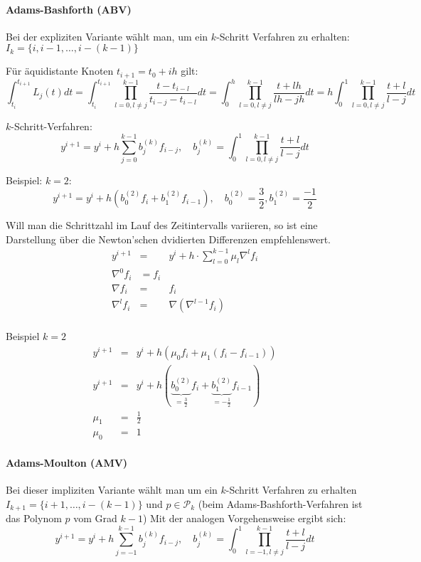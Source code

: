 \paragraph{Adams-Bashforth (ABV)}
Bei der expliziten Variante wählt man, um ein $k$-Schritt Verfahren zu erhalten: $I_{k}=\{i,i-1,\ldots,i-(k-1)\}$

Für äquidistante Knoten $t_{i+1}=t_{0}+ih$ gilt:
$$\int_{t_{i}}^{t_{i+1}}L_{j}(t)dt = \int_{t_{i}}^{t_{i+1}}\prod_{l=0,l\not = j}^{k-1}\frac{t-t_{i-l}}{t_{i-j}-t_{i-l}}dt
= \int_{0}^{h}\prod_{l=0,l\not = j}^{k-1}\frac{t+lh}{lh-jh}dt=h\int_{0}^{1}\prod_{l=0,l\not=j}^{k-1}\frac{t+l}{l-j}dt$$

$k$-Schritt-Verfahren:
$$y^{i+1}=y^{i}+h\sum_{j=0}^{k-1}b_{j}^{(k)}f_{i-j},\quad b_{j}^{(k)}=\int_{0}^{1}\prod_{l=0,l\not = j}^{k-1}\frac{t+l}{l-j}dt$$

\begin{example}
Beispiel: $k=2$:
$$y^{i+1}=y^{i}+h(b_{0}^{(2)}f_{i}+b_{1}^{(2)}f_{i-1}),\quad b_{0}^{(2)}=\frac{3}{2},b_{1}^{(2)}=\frac{-1}{2}$$
\end{example}

\begin{remark}
	Will man die Schrittzahl im Lauf des Zeitintervalls variieren, so ist eine Darstellung über die Newton'schen dvidierten Differenzen
	empfehlenswert.
	\begin{eqnarray*}
	y^{i+1}&=&y^{i}+h\cdot \sum_{l=0}^{k-1}\mu_{l}\nabla^{l}f_{i}\\
	\nabla^{0}f_{i}&=f_{i}\\
	\nabla f_{i}&=&f_{i}\\
	\nabla^{l} f_{i}&=&\nabla(\nabla^{l-1}f_{i})\\
	\end{eqnarray*}
\end{remark}

\begin{example}
 Beispiel $k=2$
 \begin{eqnarray*}
 	y^{i+1}&=&y^{i}+h(\mu_{0}f_{i}+\mu_{1}(f_{i}-f_{i-1}))\\
 	y^{i+1}&=&y^{i}+h(\underbrace{b_{0}^{(2)}}_{=\frac{3}{2}}f_{i}+\underbrace{b_{1}^{(2)}}_{=-\frac{1}{2}}f_{i-1})\\
 	\mu_{1}&=&\frac{1}{2}\\
 	\mu_{0}&=&1
 \end{eqnarray*}
\end{example}

\paragraph{Adams-Moulton (AMV)}
Bei dieser impliziten Variante wählt man um ein $k$-Schritt Verfahren zu erhalten $I_{k+1}=\{i+1,\ldots,i-(k-1)\}$ und $p\in \mathcal{P}_{k}$
(beim Adams-Bashforth-Verfahren ist das Polynom $p$ vom Grad $k-1$) Mit der analogen Vorgehensweise ergibt sich:
$$y^{i+1}=y^{i}+h\sum_{j=-1}^{k-1}b_{j}^{(k)}f_{i-j},\quad b_{j}^{(k)}=\int_{0}^{1}\prod_{l=-1,l\not =j}^{k-1}\frac{t+l}{l-j}dt$$

